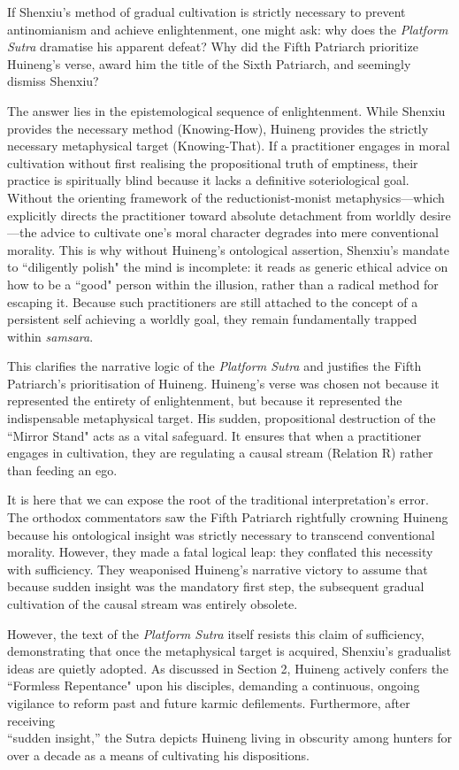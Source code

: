 If Shenxiu's method of gradual cultivation is strictly necessary to
prevent antinomianism and achieve enlightenment, one might ask: why does
the \emph{Platform Sutra} dramatise his apparent defeat? Why did the
Fifth Patriarch prioritize Huineng's verse, award him the title of the
Sixth Patriarch, and seemingly dismiss Shenxiu?

The answer lies in the epistemological sequence of enlightenment. While
Shenxiu provides the necessary method (Knowing-How), Huineng provides
the strictly necessary metaphysical target (Knowing-That). If a
practitioner engages in moral cultivation without first realising the
propositional truth of emptiness, their practice is spiritually blind
because it lacks a definitive soteriological goal. Without the orienting
framework of the reductionist-monist metaphysics---which explicitly
directs the practitioner toward absolute detachment from worldly desire---the advice to cultivate one's moral character degrades into mere
conventional morality. This is why without Huineng's ontological
assertion, Shenxiu's mandate to ``diligently polish" the mind is
incomplete: it reads as generic ethical advice on how to be a ``good"
person within the illusion, rather than a radical method for escaping
it. Because such practitioners are still attached to the concept of a
persistent self achieving a worldly goal, they remain fundamentally
trapped within \emph{samsara}.

This clarifies the narrative logic of the \emph{Platform Sutra} and
justifies the Fifth Patriarch's prioritisation of Huineng. Huineng's
verse was chosen not because it represented the entirety of
enlightenment, but because it represented the indispensable metaphysical
target. His sudden, propositional destruction of the ``Mirror Stand" acts
as a vital safeguard. It ensures that when a practitioner engages in
cultivation, they are regulating a causal stream (Relation R) rather
than feeding an ego.

It is here that we can expose the root of the traditional
interpretation's error. The orthodox commentators saw the Fifth
Patriarch rightfully crowning Huineng because his ontological insight
was strictly necessary to transcend conventional morality. However, they
made a fatal logical leap: they conflated this necessity with
sufficiency. They weaponised Huineng's narrative victory to assume that
because sudden insight was the mandatory first step, the subsequent
gradual cultivation of the causal stream was entirely obsolete.

However, the text of the \emph{Platform Sutra} itself resists this claim
of sufficiency, demonstrating that once the metaphysical target is
acquired, Shenxiu's gradualist ideas are quietly adopted. As discussed
in Section 2, Huineng actively confers the ``Formless Repentance" upon
his disciples, demanding a continuous, ongoing vigilance to reform past
and future karmic defilements. Furthermore, after receiving\\
``sudden insight,'' the Sutra depicts Huineng living in obscurity among
hunters for over a decade as a means of cultivating his dispositions.

